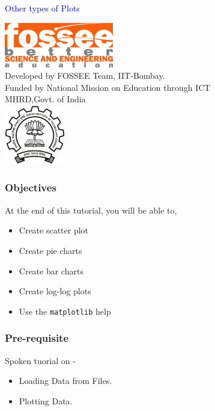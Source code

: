 \documentclass[presentation]{beamer}
\title{}
\author{FOSSEE}
\date{}
\begin{document}
\begin{frame}

\begin{center}
\vspace{12pt}
\textcolor{blue}{\huge Other types of Plots}
\end{center}
\vspace{18pt}
\begin{center}
\vspace{10pt}
\includegraphics[scale=0.95]{../images/fossee-logo.png}\\
\vspace{5pt}
\scriptsize Developed by FOSSEE Team, IIT-Bombay. \\ 
\scriptsize Funded by National Mission on Education through ICT\\
\scriptsize  MHRD,Govt. of India\\
\includegraphics[scale=0.30]{../images/iitb-logo.png}\\
\end{center}
\end{frame}
\begin{frame}
\frametitle{Objectives}
\label{sec-2}

  At the end of this tutorial, you will be able to, 


\begin{itemize}
\item Create scatter plot
\item Create pie charts
\item Create bar charts
\item Create log-log plots
\item Use the \verb~matplotlib~ help
\end{itemize}
\end{frame}
\begin{frame}
\frametitle{Pre-requisite}
\label{sec-3}

   Spoken tuorial on -

\begin{itemize}
\item Loading Data from Files.
\item Plotting Data.
\end{itemize}
\end{frame}
\end{document}

